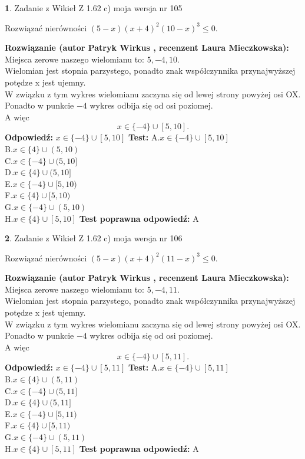 \documentclass[12pt, a4paper]{article}
\theoremstyle{definition} %
\newtheorem{zad}{}
\newcommand{\zadStart}[1]{\begin{zad}#1\newline}
\newcommand{\zadStop}{\end{zad}}
\newcommand{\rozwStart}[2]{\noindent \textbf{Rozwiązanie (autor #1 , recenzent #2): }\newline}
\newcommand{\rozwStop}{\newline}
\newcommand{\odpStart}{\noindent \textbf{Odpowiedź:}\newline}
\newcommand{\odpStop}{\newline}
\newcommand{\testStart}{\noindent \textbf{Test:}\newline}
\newcommand{\testStop}{\newline}
\newcommand{\kluczStart}{\noindent \textbf{Test poprawna odpowiedź:}\newline}
\newcommand{\kluczStop}{\newline}
\begin{document}
\zadStart{Zadanie z Wikieł Z 1.62 c) moja wersja nr 105}

Rozwiązać nierówności $(5-x)(x+4)^{2}(10-x)^{3}\le0$.
\zadStop
\rozwStart{Patryk Wirkus}{Laura Mieczkowska}
Miejsca zerowe naszego wielomianu to: $5, -4, 10$.\\
Wielomian jest stopnia parzystego, ponadto znak współczynnika przy\linebreak najwyższej potędze x jest ujemny.\\ W związku z tym wykres wielomianu zaczyna się od lewej strony powyżej osi OX.\\
Ponadto w punkcie $-4$ wykres odbija się od osi poziomej.\\
A więc $$x \in \{-4\} \cup [5,10].$$
\rozwStop
\odpStart
$x \in \{-4\} \cup [5,10]$
\odpStop
\testStart
A.$x \in \{-4\} \cup [5,10]$\\
B.$x \in \{4\} \cup (5,10)$\\
C.$x \in \{-4\} \cup (5,10]$\\
D.$x \in \{4\} \cup (5,10]$\\
E.$x \in \{-4\} \cup [5,10)$\\
F.$x \in \{4\} \cup [5,10)$\\
G.$x \in \{-4\} \cup (5,10)$\\
H.$x \in \{4\} \cup [5,10]$
\testStop
\kluczStart
A
\kluczStop



\zadStart{Zadanie z Wikieł Z 1.62 c) moja wersja nr 106}

Rozwiązać nierówności $(5-x)(x+4)^{2}(11-x)^{3}\le0$.
\zadStop
\rozwStart{Patryk Wirkus}{Laura Mieczkowska}
Miejsca zerowe naszego wielomianu to: $5, -4, 11$.\\
Wielomian jest stopnia parzystego, ponadto znak współczynnika przy\linebreak najwyższej potędze x jest ujemny.\\ W związku z tym wykres wielomianu zaczyna się od lewej strony powyżej osi OX.\\
Ponadto w punkcie $-4$ wykres odbija się od osi poziomej.\\
A więc $$x \in \{-4\} \cup [5,11].$$
\rozwStop
\odpStart
$x \in \{-4\} \cup [5,11]$
\odpStop
\testStart
A.$x \in \{-4\} \cup [5,11]$\\
B.$x \in \{4\} \cup (5,11)$\\
C.$x \in \{-4\} \cup (5,11]$\\
D.$x \in \{4\} \cup (5,11]$\\
E.$x \in \{-4\} \cup [5,11)$\\
F.$x \in \{4\} \cup [5,11)$\\
G.$x \in \{-4\} \cup (5,11)$\\
H.$x \in \{4\} \cup [5,11]$
\testStop
\kluczStart
A
\kluczStop
\end{document}
